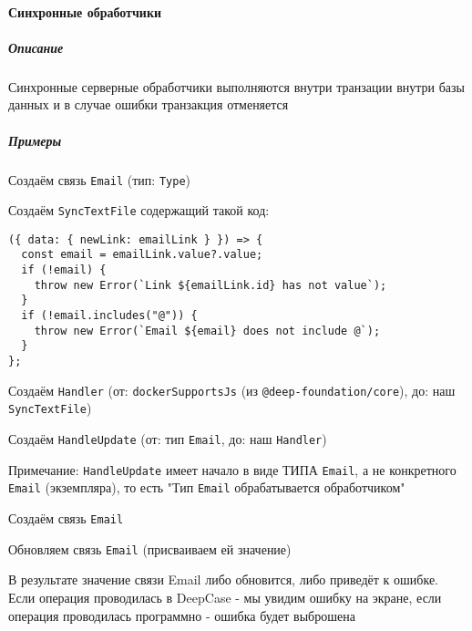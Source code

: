 \documentclass{article}
\begin{document}
\paragraph{Синхронные обработчики}
\subparagraph{Описание}

Синхронные серверные обработчики выполняются внутри транзации внутри базы
данных и в случае ошибки
транзакция отменяется
\subparagraph{Примеры}

Создаём связь \texttt{Email} (тип: \texttt{Type})

Создаём \texttt{SyncTextFile} содержащий такой код:

\begin{lstlisting}
({ data: { newLink: emailLink } }) => {
  const email = emailLink.value?.value;
  if (!email) {
    throw new Error(`Link ${emailLink.id} has not value`);
  }
  if (!email.includes("@")) {
    throw new Error(`Email ${email} does not include @`);
  }
};
\end{lstlisting}

Создаём \texttt{Handler} (от: \texttt{dockerSupportsJs} (из
\texttt{@deep-foundation/core}), до: наш \texttt{SyncTextFile})

Создаём \texttt{HandleUpdate} (от: тип \texttt{Email}, до: наш
\texttt{Handler})

Примечание: \texttt{HandleUpdate} имеет начало в виде ТИПА \texttt{Email}, а
не конкретного \texttt{Email} (экземпляра), то есть "Тип \texttt{Email}
обрабатывается обработчиком"

Создаём связь \texttt{Email}

Обновляем связь \texttt{Email} (присваиваем ей значение)

В результате значение связи Email либо обновится, либо приведёт к ошибке.
Если операция проводилась в DeepCase - мы увидим ошибку на экране, если
операция проводилась программно - ошибка будет выброшена
\end{document}
